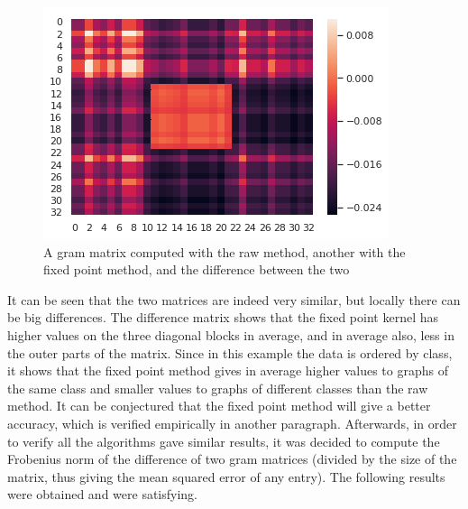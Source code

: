 \documentclass{article}
\theoremstyle{definition}
\begin{document}
\begin{figure}[!htb]
\begin{multicols}{3}
		\includegraphics[width=\linewidth]{data/gram/gram5.png}\par
	\end{multicols}
	\caption{A gram matrix computed with the raw method, another with the fixed point method, and the difference between the two}
\end{figure}
It can be seen that the two matrices are indeed very similar, but locally there can be big differences. The difference matrix shows that the fixed point kernel has higher values on the three diagonal blocks in average, and in average also, less in the outer parts of the matrix. Since in this example the data is ordered by class, it shows that the fixed point method gives in average higher values to graphs of the same class and smaller values to graphs of different classes than the raw method. It can be conjectured that the fixed point method will give a better accuracy, which is verified empirically in another paragraph.
Afterwards, in order to verify all the algorithms gave similar results, it was decided to compute the Frobenius norm of the difference of two gram matrices (divided by the size of the matrix, thus giving the mean squared error of any entry). The following results were obtained and were satisfying.
\end{document}
